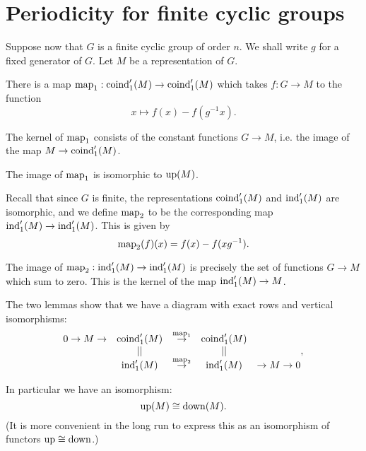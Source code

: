\section{Periodicity for finite cyclic groups}

Suppose now that $G$ is a finite cyclic group of order $n$.
We shall write $g$ for a fixed generator of $G$.
Let $M$ be a representation of $G$.


\begin{definition}
	There is a map $\mathrm{map}_1 : \mathrm{coind}_1'(M) \to \mathrm{coind}_1'(M)$ which takes $f : G \to M$ to the function
	\[
		x \mapsto f(x) - f(g^{-1}x).
	\]
\end{definition}


\begin{lemma}
	The kernel of $\mathrm{map}_1$ consists of the constant functions $G \to M$, i.e. the image of the
	map $M \to \mathrm{coind}_1'(M)$.
\end{lemma}

\begin{corollary}
	The image of $\mathrm{map}_1$ is isomorphic to $\mathrm{up}(M)$.
\end{corollary}

Recall that since $G$ is finite, the representations $\mathrm{coind}_1'(M)$ and $\mathrm{ind}_1'(M)$
are isomorphic, and we define $\mathrm{map}_2$ to be the corresponding map $\mathrm{ind}_1'(M) \to \mathrm{ind}_1'(M)$.
This is given by
\[
	\mathrm{map}_2(f) (x) = f(x) - f(xg^{-1}).
\]

\begin{lemma}
	The image of $\mathrm{map}_2 : \mathrm{ind}_1'(M) \to \mathrm{ind}_1'(M)$ is precisely the set of functions $G \to M$
	which sum to zero. This is the kernel of the map $\mathrm{ind}_1'(M) \to M$.
\end{lemma}




The two lemmas show that we have a diagram with exact rows and vertical isomorphisms:
\[
	\begin{matrix}
		0 \to M \to &\mathrm{coind}_1'(M)& \stackrel{\mathrm{map}_1}\to& \mathrm{coind}_1'(M)\\
		& || &&|| \\
		& \mathrm{ind}_1'(M)& \stackrel{\mathrm{map}_2}\to& \mathrm{ind}_1'(M) &\to M \to 0
	\end{matrix},
\]


\begin{corollary}
	In particular we have an isomorphism:
	\[
		\mathrm{up}(M) \cong \mathrm{down}(M).
	\]
	(It is more convenient in the long run to express this as an isomorphism of functors
	$\mathrm{up} \cong \mathrm{down}$.)
\end{corollary}

